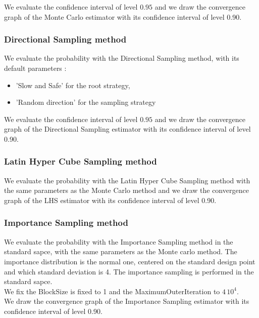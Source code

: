 \documentclass[11pt]{article}
\begin{document}
We evaluate the confidence interval of level $0.95$ and we draw the convergence graph of the Monte Carlo estimator with its confidence interval of level 0.90.



\subsubsection{Directional Sampling method}

We evaluate the probability with the Directional Sampling method, with its default parameters :
\begin{itemize}
\item 'Slow and Safe' for the root strategy,
\item 'Random direction' for the sampling strategy
\end{itemize}


We evaluate the confidence interval of level $0.95$ and we draw the convergence graph of the Directional Sampling  estimator with its confidence interval of level 0.90.


\subsubsection{Latin Hyper Cube Sampling method}

We evaluate the probability with the Latin Hyper Cube Sampling method with the same parameters as the Monte Carlo method and we draw the convergence graph of the LHS estimator with its confidence interval of level 0.90.





\subsubsection{Importance Sampling method}


We evaluate the probability with the Importance Sampling method in the standard sapce, with the same parameters as the Monte carlo method. The importance distribution is the normal one, centered on the standard design point and which standard deviation is 4. The importance sampling is performed in the standard sapce.\\

We fix the BlockSize is fixed to 1 and the MaximumOuterIteration to $4\, 10^4$.\\

We draw the convergence graph of the Importance Sampling  estimator with its confidence interval of level 0.90.
\end{document}
